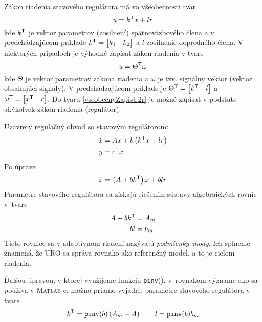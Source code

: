 \documentclass[a4paper, 10pt, ]{article}
\begin{document}
Zákon riadenia stavového regulátora má vo všeobecnosti tvar
\begin{equation}
    u = k^{\mathsf{T}} x + l r
\end{equation}
kde $k^{\mathsf{T}}$ je vektor parametrov (zosilnení) spätnoväzbového člena a v predchádzajúcom príklade $k^{\mathsf{T}} = \begin{bmatrix} k_1 & k_2 \end{bmatrix}$ a $l$ zosilnenie dopredného člena. V niektorých prípadoch je výhodné zapísať zákon riadenia v tvare
\begin{equation} \label{vseobecnyZapisU2r}
    u = \Theta^{\mathsf{T}} \omega
\end{equation}
kde $\Theta$ je vektor parametrov zákona riadenia a $\omega$ je tzv. signálny vektor (vektor obsahujúci signály). V predchádzajúcom príklade je $\Theta^{\mathsf{T}} = \begin{bmatrix} k^{\mathsf{T}} & l \end{bmatrix}$ a $\omega^{\mathsf{T}} = \begin{bmatrix} x^{\mathsf{T}} & r  \end{bmatrix}$. Do tvaru \eqref{vseobecnyZapisU2r} je možné zapísať v podstate akýkoľvek zákon riadenia (regulátor).

Uzavretý regulačný obvod so stavovým regulátorom:
\begin{subequations}
    \begin{align}
         \dot x &= A x + b \left( k^{\mathsf{T}} x + l r \right)\\
         y &= c^{\mathsf{T}} x
    \end{align}
\end{subequations}
Po úprave
\begin{align}
    \dot x = \left( A + b k^{\mathsf{T}} \right) x + b l r
\end{align}
Parametre stavového regulátora sa získajú riešením sústavy algebraických rovníc v~tvare
\begin{subequations} \label{podmienkyZhody2r}
    \begin{align}
        A + b k^{\mathsf{T}} & = A_m \\
        b l &= b_m
    \end{align}
\end{subequations}
Tieto rovnice sa v adaptívnom riadení nazývajú \emph{podmienky zhody}. Ich splnenie znamená, že URO sa správa rovnako ako referenčný model, a to je cieľom riadenia.

Ďalšou úpravou, v ktorej využijeme funkciu \verb+pinv+(), v~rovnakom význame ako sa používa v \textsc{Matlab}-e, možno priamo vyjadriť parametre stavového regulátora v tvare
\begin{equation*}
    k^\naT = \verb|pinv|(b) \left( A_m - A \right) \qquad l = \verb|pinv|(b) b_m
\end{equation*}
\end{document}
